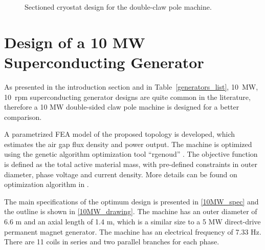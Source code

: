 \documentclass[12pt]{iopart}
\begin{document}
\begin{figure}[]
    \caption{Sectioned cryostat design for the double-claw pole machine.} 
    \label{cryostat_variants}
\end{figure}

\section{Design of a 10 MW Superconducting Generator}
 
As presented in the introduction section and in Table~\ref{generators_list}, 10~MW, 10~rpm superconducting generator designs are quite common in the literature, therefore a 10 MW double-sided claw pole machine is designed for a better comparison.

A parametrized FEA model of the proposed topology is developed, which estimates the air gap flux density and power output. The machine is optimized using the genetic algorithm optimization tool ``rgenoud'' \cite{Mebane2011}. 
The objective function is defined as the total active material mass, with pre-defined constraints in outer diameter, phase voltage and current density.
More details can be found on optimization algorithm in \cite{github-repo}.


The main specifications of the optimum design is presented in \ref{10MW_spec} and the outline is shown in \ref{10MW_drawing}. The machine has an outer diameter of 6.6 m and an axial length of 1.4 m, which is a similar size to a 5 MW direct-drive permanent magnet generator. The machine has an electrical frequency of 7.33 Hz. There are 11 coils in series and two parallel branches for each phase.
\end{document}
